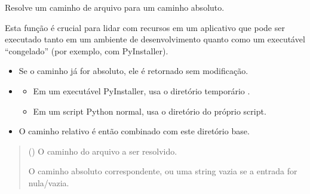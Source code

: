 \documentclass[letterpaper,10pt,english]{sphinxmanual}
\begin{document}
\begin{fulllineitems}
\label{\detokenize{api/app:app.abs_path}}
\pysigstartsignatures
\pysiglinewithargsret
{}
{}
{}
\pysigstopsignatures
\sphinxAtStartPar
Resolve um caminho de arquivo para um caminho absoluto.

\sphinxAtStartPar
Esta função é crucial para lidar com recursos em um aplicativo que pode ser
executado tanto em um ambiente de desenvolvimento quanto como um executável
“congelado” (por exemplo, com PyInstaller).
\begin{itemize}
\item {} 
\sphinxAtStartPar
Se o caminho já for absoluto, ele é retornado sem modificação.

\item {} \begin{description}
\begin{itemize}
\item {} 
\sphinxAtStartPar
Em um executável PyInstaller, usa o diretório temporário .

\item {} 
\sphinxAtStartPar
Em um script Python normal, usa o diretório do próprio script.

\end{itemize}

\end{description}

\item {} 
\sphinxAtStartPar
O caminho relativo é então combinado com este diretório base.

\end{itemize}
\begin{quote}\begin{description}
\sphinxAtStartPar
{} () \textendash{} O caminho do arquivo a ser resolvido.

\sphinxAtStartPar
O caminho absoluto correspondente, ou uma string vazia se a entrada for nula/vazia.

\sphinxAtStartPar
{}

\end{description}\end{quote}

\end{fulllineitems}
\end{document}
